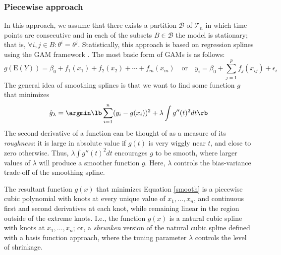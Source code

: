 \subsubsection{Piecewise approach}
In this approach, we assume that there exists a partition $\mathcal{B}$ of $\mathcal{T}_n$ in which time points are consecutive and in each of the subsets $B \in \mathcal{B}$ the model is stationary; that is, $\forall i,j \in B: \theta^i = \theta^j$. Statistically, this approach is based on regression splines using the GAM framework \cite{haslbeck2017estimate,bringmann2017changing}. The most basic form of GAMs is as follows:
\begin{equation}
    g(\text{E}(Y)) = \beta_0 + f_1(x_1) + f_2(x_2) + \cdots + f_m(x_m) \quad \text{or} \quad y_i = \beta_0 + \sum_{j=1}^p f_j(x_{ij}) + \epsilon_i
\end{equation}
The general idea of smoothing splines is that we want to find some function $g$ that minimizes
\begin{equation} \label{smooth}
    \hat{g}_{\lambda} = \argmin \lb \sum_{i=1}^n (y_i - g(x_i))^2 + \lambda \int g''(t)^2 dt \rb
\end{equation}
The second derivative of a function can be thought of as a measure of its \textit{roughness}: it is large in absolute value if $g(t)$ is very wiggly near $t$, and close to zero otherwise. Thus, $\lambda \int g''(t)^2 dt$ encourages $g$ to be smooth, where larger values of $\lambda$ will produce a smoother function $g$. Here, $\lambda$ controls the bias-variance trade-off of the smoothing spline. 

The resultant function $g(x)$ that minimizes Equation \ref{smooth} is a piecewise cubic polynomial with knots at every unique value of $x_1, \dots, x_n$, and continuous first and second derivatives at each knot, while remaining linear in the region outside of the extreme knots. I.e., the function $g(x)$ is a natural cubic spline with knots at $x_1,\dots,x_n$; or, a \textit{shrunken} version of the natural cubic spline defined with a basis function approach, where the tuning parameter $\lambda$ controls the level of shrinkage.


